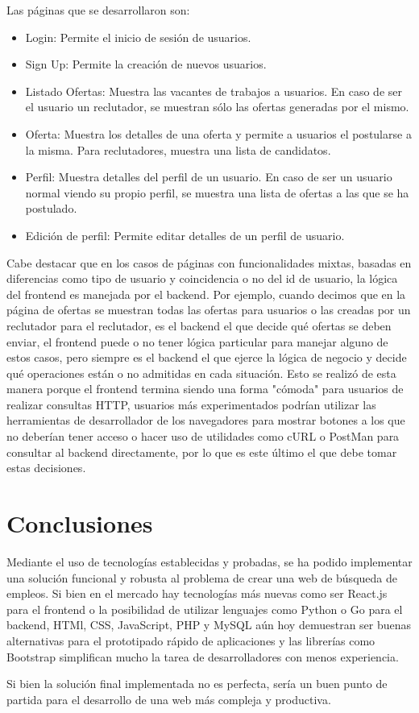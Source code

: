 \documentclass[a4paper]{article}
\begin{document}
Las páginas que se desarrollaron son:

\begin{itemize}
    \item Login: Permite el inicio de sesión de usuarios.
    \item Sign Up: Permite la creación de nuevos usuarios.
    \item Listado Ofertas: Muestra las vacantes de trabajos a usuarios. En caso
        de ser el usuario un reclutador, se muestran sólo las ofertas generadas
        por el mismo.
    \item Oferta: Muestra los detalles de una oferta y permite a usuarios el
        postularse a la misma. Para reclutadores, muestra una lista de
        candidatos.
    \item Perfil: Muestra detalles del perfil de un usuario. En caso de ser un
        usuario normal viendo su propio perfil, se muestra una lista de
        ofertas a las que se ha postulado.
    \item Edición de perfil: Permite editar detalles de un perfil de usuario.
\end{itemize}

Cabe destacar que en los casos de páginas con funcionalidades mixtas, basadas
en diferencias como tipo de usuario y coincidencia o no del id de usuario, la
lógica del frontend es manejada por el backend. Por ejemplo, cuando decimos
que en la página de ofertas se muestran todas las ofertas para usuarios o las
creadas por un reclutador para el reclutador, es el backend el que decide qué
ofertas se deben enviar, el frontend puede o no tener lógica particular para
manejar alguno de estos casos, pero siempre es el backend el que ejerce la
lógica de negocio y decide qué operaciones están o no admitidas en cada
situación. Esto se realizó de esta manera porque el frontend termina siendo
una forma "cómoda" para usuarios de realizar consultas HTTP, usuarios más
experimentados podrían utilizar las herramientas de desarrollador de los
navegadores para mostrar botones a los que no deberían tener acceso o hacer uso
de utilidades como cURL o PostMan para consultar al backend directamente, por
lo que es este último el que debe tomar estas decisiones.

\section{Conclusiones}
Mediante el uso de tecnologías establecidas y probadas, se ha podido
implementar una solución funcional y robusta al problema de crear una web de
búsqueda de empleos. Si bien en el mercado hay tecnologías más nuevas como ser
React.js para el frontend o la posibilidad de utilizar lenguajes como Python o
Go para el backend, HTMl, CSS, JavaScript, PHP y MySQL aún hoy demuestran ser
buenas alternativas para el prototipado rápido de aplicaciones y las librerías
como Bootstrap simplifican mucho la tarea de desarrolladores con menos
experiencia.

Si bien la solución final implementada no es perfecta, sería un buen punto de
partida para el desarrollo de una web más compleja y productiva.
\end{document}
